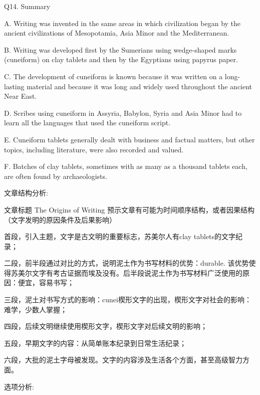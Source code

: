 \begin{blk}
    \begin{qst}
        Q14. Summary
    \end{qst}

    \begin{chc}
        A. Writing was invented in the same areas in which civilization began by the ancient civilizations of Mesopotamia, Asia Minor and the Mediterranean.

        B. Writing was developed first by the Sumerians using wedge-shaped marks (cuneiform) on clay tablets and then by the Egyptians using papyrus paper.

        C. The development of cuneiform is known because it was written on a long-lasting material and because it was long and widely used throughout the ancient Near East.

        D. Scribes using cuneiform in Assyria, Babylon, Syria and Asia Minor had to learn all the languages that used the cuneiform script.

        E. Cuneiform tablets generally dealt with business and factual matters, but other topics, including literature, were also recorded and valued.

        F. Batches of clay tablets, sometimes with as many as a thousand tablets each, are often found by archaeologists.
    \end{chc}

    \begin{nlz}
        文章结构分析:

        文章标题 The Origins of Writing 预示文章有可能为时间顺序结构，或者因果结构（文字发明的原因条件及后果影响）

        首段，引入主题，文字是古文明的重要标志，苏美尔人有clay tablets的文字纪录；

        二段，前半段通过对比的方式，说明泥土作为书写材料的优势：durable. 该优势使得苏美尔文字有考古证据而埃及没有。后半段说泥土作为书写材料广泛使用的原因：便宜，容易书写；

        三段，泥土对书写方式的影响：cunei楔形文字的出现，楔形文字对社会的影响：难学，少数人掌握；

        四段，后续文明继续使用楔形文字，楔形文字对后续文明的影响；

        五段，早期文字的内容：从简单账本纪录到日常生活纪录；

        六段，大批的泥土字母被发现。文字的内容涉及生活各个方面，甚至高级智力方面。

        选项分析:


\end{nlz}
\end{blk}
